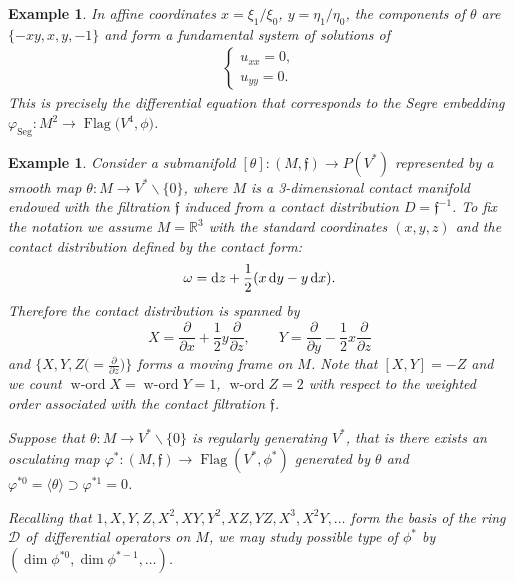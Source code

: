 \documentclass[pdftex]{sigma}%
\newcommand{\R}{\mathbb R}
\newcommand{\cD}{\mathcal D}
\newcommand{\f}{\mathfrak f}
\newcommand{\Flag}{\operatorname{Flag}}
\newcommand{\word}{\operatorname{w-ord}}
\newtheorem{ex}[thm]{Example}
\numberwithin{equation}{section}
\begin{document}
\begin{ex}
In affine coordinates $x=\xi_1/\xi_0$, $y=\eta_1/\eta_0$, the components of $\theta$ are $\{-xy, x, y, -1\}$ and form a fundamental system of solutions of
\begin{gather*}
\begin{cases}
u_{xx}=0, \\
u_{yy}=0.
\end{cases}
\end{gather*}
This is precisely the differential equation that corresponds to the Segre embedding $\varphi_{\text{Seg}}\colon M^2\to \Flag\big(V^4,\phi\big)$.
\end{ex}

\begin{ex}\label{ex:A2}
	Consider a submanifold $[\theta]\colon (M,\f)\to P(V^*)$ represented by a smooth map $\theta\colon M\to V^*\backslash\{0\}$, where $M$ is a 3-dimensional contact manifold endowed with the filtration $\f$ induced from a contact distribution $D=\f^{-1}$. To fix the notation we assume $M=\R^3$ with the standard coordinates $(x,y,z)$ and the contact distribution defined by the contact form:
	\[
	\omega = {\rm d}z+\frac{1}{2}(x\,{\rm d}y-y\,{\rm d}x).
	\]
	Therefore the contact distribution is spanned by
	\[
	X = \frac{\partial}{\partial x} + \frac{1}{2}y\frac{\partial}{\partial z},\qquad
	Y = \frac{\partial}{\partial y} - \frac{1}{2}x\frac{\partial}{\partial z}
	\]
	and $\big\{X,Y,Z\big({=}\frac{\partial}{\partial z}\big)\big\}$ forms a moving frame on $M$. Note that $[X,Y]=-Z$ and we count $\word X=\word Y = 1$, $\word Z=2$ with respect to the weighted order associated with the contact filtration $\f$.
	
	Suppose that $\theta\colon M\to V^*\backslash\{0\}$ is regularly generating $V^*$, that is there exists an osculating map $\varphi^*\colon (M,\f)\to \Flag(V^*,\phi^*)$ generated by $\theta$ and $\varphi^{*0}=\langle \theta\rangle \supset \varphi^{*1}=0$.
	
	Recalling that $1,X,Y,Z,X^2,XY,Y^2,XZ,YZ,X^3,X^2Y,\dots$ form the basis of the ring $\cD$ of~dif\-ferential operators on $M$, we may study possible type of $\phi^*$ by $\left(\dim \phi^{*0}, \dim \phi^{*-1},\dots\right)$.
	

\end{ex}
\end{document}
